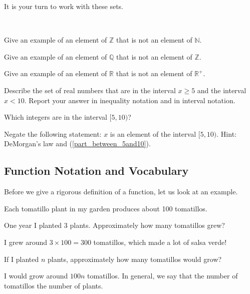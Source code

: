 It is your turn to work with these sets.

\begin{act}
\label{act_sets_int_real}
~
    \begin{actpart}        
        \item Give an example of an element of $\mathbb{Z}$ that is not an element of $\mathbb{N}$.
        \item Give an example of an element of $\mathbb{Q}$ that is not an element of $\mathbb{Z}$.
        \item Give an example of an element of $\mathbb{R}$ that is not an element of $\mathbb{R}^+$.
        \item \label{part_between_5and10} Describe the set of real numbers that are in the interval $x \ge 5$ and the interval $x < 10$.  Report your answer in inequality notation and in interval notation.        
        \item Which integers are in the interval $[5,10)$?
        \item Negate the following statement:  $x$ is an element of the interval $[5,10)$. Hint: DeMorgan's law and (\ref{part_between_5and10}).
    \end{actpart}
\end{act}

\newcommand{\subdefnfnnotation}{Function Notation and Vocabulary}
\subsection{\subdefnfnnotation}
\label{sub_defn_function_notation}

Before we give a rigorous definition of a function, let us look at an example.

\begin{exam}[Garden]
\label{exam_garden}
    Each tomatillo plant in my garden produces about 100 tomatillos.  
        \begin{apart}
            \item One year I planted 3 plants.  Approximately how many tomatillos grew?
                \begin{soln}
                    I grew around $3 \times 100 = 300$ tomatillos, which made a lot of salsa verde!
                \end{soln}
            \item If I planted $n$ plants, approximately how many tomatillos would grow?
                \begin{soln}
                    I would grow around $100n$ tomatillos. In general, we say that the number of tomatillos  the number of plants. 
                \end{soln}
        \end{apart} 
\end{exam}

